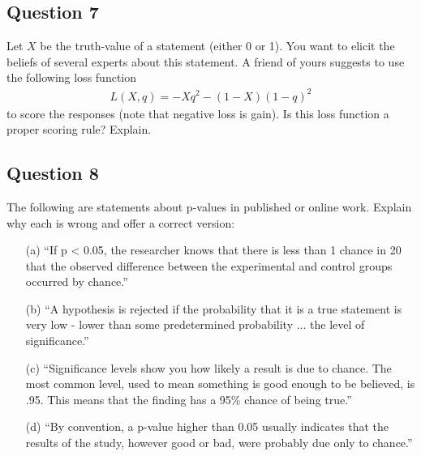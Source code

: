 \subsection*{Question 7}
Let $X$ be the truth-value of a statement (either 0 or 1). You want to elicit the beliefs of several experts about this statement. A friend of yours suggests to use the following loss function 
\begin{align*}
L(X,q) = -Xq^2-(1-X)(1-q)^2
\end{align*}
to score the responses (note that negative loss is gain). Is this loss function a proper scoring rule? Explain.

\subsection*{Question 8}
The following are statements about p-values in published or online work. Explain why each is wrong and offer a correct version:
\begin{itemize}
	\item[(a)] ``If p < 0.05, the researcher knows that there is less than 1 chance in 20 that the observed difference between the experimental and control groups occurred by chance.''
  \item[(b)] ``A hypothesis is rejected if the probability that it is a true statement is very low - lower than some predetermined probability ... the level of significance.''
  \item[(c)] ``Significance levels show you how likely a result is due to chance. The most common level, used to mean something is good enough to be believed, is .95. This means that the finding has a 95\% chance of being true.''
  \item[(d)] ``By convention, a p-value higher than 0.05 usually indicates that the results of the study, however good or bad, were probably due only to chance.''
\end{itemize}